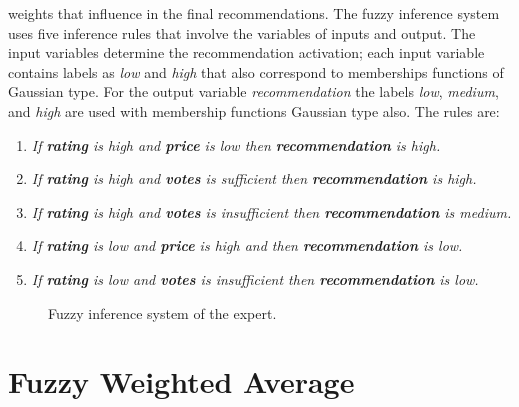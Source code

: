 weights that influence in the final recommendations. The fuzzy
inference system uses five inference rules that involve the variables of
inputs and output. The input variables determine the recommendation
activation; each input variable contains labels as \textit{low} and
\textit{high} that also correspond to memberships functions of
Gaussian type. For the output variable \textit{recommendation} the
labels \textit{low}, \textit{medium}, and \textit{high} are used with
membership functions Gaussian type also. The rules are:
\begin{enumerate} 
\item \textit{If \textbf{rating} is high and \textbf{price} is low then 
\textbf{recommendation} is high.}
\item \textit{If \textbf{rating} is high and \textbf{votes} is sufficient then 
\textbf{recommendation} is high.}
\item \textit{If \textbf{rating} is high and \textbf{votes} is insufficient then 
\textbf{recommendation} is medium.}
\item \textit{If \textbf{rating} is low and \textbf{price} is high and then 
\textbf{recommendation} is low.} 
\item \textit{If \textbf{rating} is low and \textbf{votes} is insufficient then 
\textbf{recommendation} is low.}
\end{enumerate} 
\begin{figure}
\captionsetup{justification=centering,margin=2cm,font=footnotesize}
\centering
{}
\caption{Fuzzy inference system of the expert.}
\label{fig:expertfis}      
\end{figure}

\section{Fuzzy Weighted Average} 

